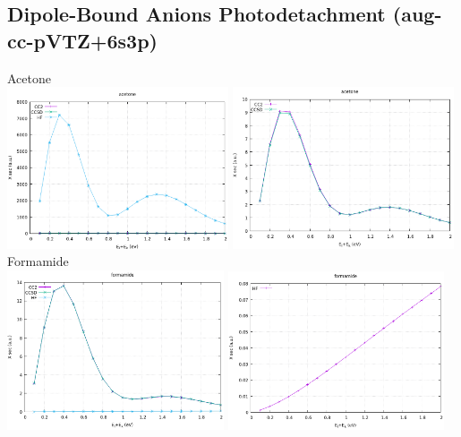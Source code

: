 \subsection*{Dipole-Bound Anions Photodetachment (aug-cc-pVTZ+6s3p)}
Acetone\\
\includegraphics[width=0.49\textwidth]{chapters/appendix/image/Acetone1.png}
\includegraphics[width=0.49\textwidth]{chapters/appendix/image/Acetone2.png}\\
\vfill
Formamide\\
\includegraphics[width=0.48\textwidth]{chapters/appendix/image/Formamide1.png}
\includegraphics[width=0.48\textwidth]{chapters/appendix/image/Formamide2.png}\\
\vfill
\clearpage

